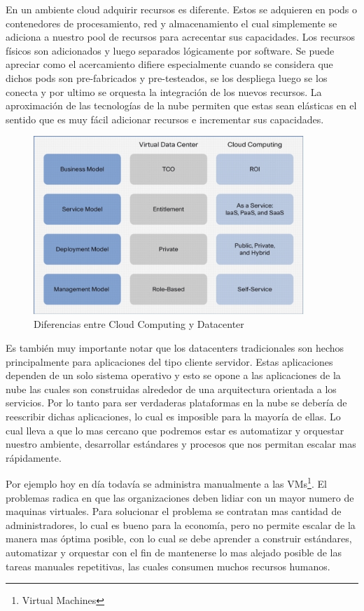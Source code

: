 \documentclass[12pt,a4paper]{article}
\begin{document}
En un ambiente cloud adquirir recursos es diferente. Estos se adquieren en pods o contenedores de 
procesamiento, red y almacenamiento el cual simplemente se adiciona a nuestro pool de recursos para 
acrecentar sus capacidades. Los recursos físicos son adicionados y luego separados lógicamente por 
software. Se puede apreciar como el acercamiento difiere especialmente cuando se considera que dichos 
pods son pre-fabricados y pre-testeados, se los despliega luego se los conecta y por ultimo se 
orquesta la integración de los nuevos recursos. La aproximación de las tecnologías de la nube 
permiten que estas sean elásticas en el sentido que es muy fácil adicionar recursos e incrementar sus 
capacidades.

\begin{figure}[h!]
 \centering
 \includegraphics[width=0.91\textwidth]{white_paper.jpg}
\caption[Diferencia Entre Cloud y Datacenter]{Diferencias entre Cloud Computing y Datacenter}
\end{figure}\par

Es también muy importante notar que los datacenters tradicionales son hechos principalmente para 
aplicaciones del tipo cliente servidor. Estas aplicaciones dependen de un solo sistema operativo y 
esto se opone a las aplicaciones de la nube las cuales son construidas alrededor de una arquitectura
orientada a los servicios. Por lo tanto para ser verdaderas plataformas en la nube se debería de 
reescribir dichas aplicaciones, lo cual es imposible para la mayoría de ellas. Lo cual lleva a que
lo mas cercano que podremos estar es automatizar y orquestar nuestro ambiente, desarrollar estándares
y procesos que nos permitan escalar mas rápidamente.

Por ejemplo hoy en día todavía se administra manualmente a las VMs\footnote{Virtual Machines}. El 
problemas radica en que las organizaciones deben lidiar con un mayor numero de maquinas virtuales.
Para solucionar el problema se contratan mas cantidad de administradores, lo cual es bueno para la 
economía, pero no permite escalar de la manera mas óptima posible, con lo cual se debe aprender a
construir estándares, automatizar y orquestar con el fin de mantenerse lo mas alejado posible de
las tareas manuales repetitivas, las cuales consumen muchos recursos humanos.
\end{document}
